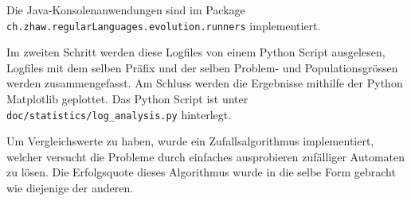 Die Java-Konsolenanwendungen sind im Package \lstinline$ch.zhaw.regularLanguages.evolution.runners$ implementiert.

Im zweiten Schritt werden diese Logfiles von einem Python Script ausgelesen, Logfiles mit dem selben Präfix und der selben Problem- und Populationsgrössen werden zusammengefasst. Am Schluss werden die Ergebnisse mithilfe der Python Matplotlib \cite{matplotlib} geplottet. Das Python Script ist unter \lstinline$doc/statistics/log_analysis.py$ hinterlegt.

Um Vergleichswerte zu haben, wurde ein Zufallsalgorithmus implementiert, welcher versucht die Probleme durch einfaches ausprobieren zufälliger Automaten zu lösen. Die Erfolgsquote dieses Algorithmus wurde in die selbe Form gebracht wie diejenige der anderen.